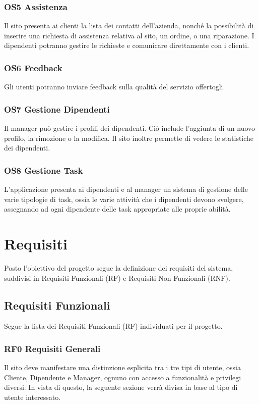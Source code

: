 \documentclass{report}
\begin{document}
\subsection*{OS5 Assistenza}
Il sito presenta ai clienti la lista dei contatti dell’azienda, nonché la possibilità di inserire una richiesta di assistenza relativa al sito, un ordine, o una riparazione. I dipendenti potranno gestire le richieste e comunicare direttamente con i clienti.


\subsection*{OS6 Feedback}
Gli utenti potranno inviare feedback sulla qualità del servizio offertogli.

\subsection*{OS7 Gestione Dipendenti}

Il manager può gestire i profili dei dipendenti. Ciò include l’aggiunta di un nuovo profilo, la rimozione o la modifica. Il sito inoltre permette di vedere le statistiche dei dipendenti.


\subsection*{OS8 Gestione Task}
L’applicazione presenta ai dipendenti e al manager un sistema di gestione delle varie tipologie di task, ossia le varie attività che i dipendenti devono svolgere, assegnando ad ogni dipendente delle task appropriate alle proprie abilità.


\chapter{Requisiti}
Posto l’obiettivo del progetto segue la definizione dei requisiti del sistema, suddivisi in Requisiti Funzionali (RF) e Requisiti Non Funzionali (RNF).



\section{Requisiti Funzionali}
Segue la lista dei Requisiti Funzionali (RF) individuati per il progetto.


\subsection*{RF0 Requisiti Generali}
Il sito deve manifestare una distinzione esplicita tra i tre tipi di utente, ossia Cliente, Dipendente e Manager, ognuno con accesso a funzionalità e privilegi diversi.
In vista di questo, la seguente sezione verrà divisa in base al tipo di utente interessato.
\end{document}
